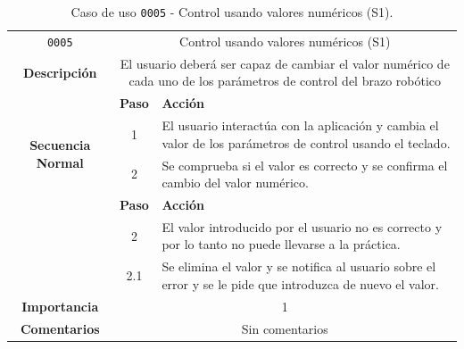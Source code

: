 \begin{table}[H]
    \centering
    \begin{tabularx}{\textwidth}{|c|c|X|}
        \cline{1-3}
        \texttt{0005}                              & \multicolumn{2}{c|}{Control usando valores numéricos (\ac{S1})}                                                                                                                      \\ \cline{1-3}
        \textbf{Descripción}                       & \multicolumn{2}{m{13cm}|}{El usuario deberá ser capaz de cambiar el valor numérico de cada uno de los parámetros de control del brazo robótico}
        \\ \cline{1-3}
        \multirow{4}{*}{\textbf{Secuencia Normal}} & \textbf{Paso}                                                                                                                                        & \textbf{Acción}
        \\ \cline{2-3}                    &   1  & El usuario interactúa con la aplicación y cambia el valor de los parámetros de control usando el teclado.
        \\ \cline{2-3}                    &   2  & Se comprueba si el valor es correcto y se confirma el cambio del valor numérico.
        \\ \cline{1-3}
        \multirow{2}{*}{\textbf{Excepciones}} & \textbf{Paso}  & \textbf{Acción}
        \\ \cline{2-3}                        &   2  & El valor introducido por el usuario no es correcto y por lo tanto no puede llevarse a la práctica.
        \\ \cline{2-3} 
                                              &  2.1 & Se elimina el valor y se notifica al usuario sobre el error y se le pide que introduzca de nuevo el valor.
        \\ \cline{1-3}
        \textbf{Importancia}                       & \multicolumn{2}{c|}{1}                                                                                                                                                 \\ \cline{1-3}
        \textbf{Comentarios}                       & \multicolumn{2}{c|}{Sin comentarios}                                                                                                                                   \\ \cline{1-3}
    \end{tabularx}
    \caption{Caso de uso \texttt{0005} - Control usando valores numéricos (\ac{S1}).}
    \label{tab:CU0005}
    \label{tab:caso_de_uso_control_usando_valores_numericos}
\end{table}

